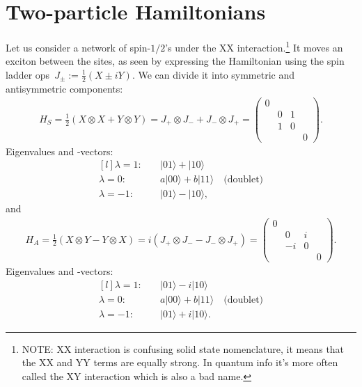 \documentclass[aps,pra,12pt,nofootinbib,superscriptaddress,longbibliography,showpacs]{revtex4-1}
\theoremstyle{plain}
\theoremstyle{definition}
\newcommand{\ket}[1]{\ensuremath{|#1\rangle}}
\newcommand{\be}{\begin{equation}}
\newcommand{\ee}{\end{equation}}
\begin{document}
\section{Two-particle Hamiltonians} \label{sec:twoparticle}

Let us consider a network of spin-$1/2$'s under the XX
interaction.\footnote{NOTE: XX interaction is confusing solid state
nomenclature, it means that the XX
and YY terms are equally strong. In quantum info it's more often
called the XY interaction which is also a bad name.}
It moves an exciton between the sites, as seen by expressing the
Hamiltonian using the spin ladder ops~$J_\pm := \tfrac{1}{2}(X \pm i Y)$.
We can divide it into symmetric and antisymmetric components:
\begin{align}
H_S = \frac{1}{2}\left(X \otimes X +Y \otimes Y\right)
= J_+ \otimes J_- +J_- \otimes J_+
=
\begin{pmatrix}
0\\
& 0 & 1\\
& 1 & 0\\
& & & 0
\end{pmatrix}.
\label{eq:HS}
\end{align}
Eigenvalues and -vectors:
\be
\begin{matrix*}[l]
\lambda = 1: & \quad \ket{01} +\ket{10}\\
\lambda = 0: & \quad a\ket{00} +b\ket{11} \quad \text{(doublet)}\\
\lambda = -1: & \quad \ket{01} -\ket{10},
\end{matrix*}
\ee
and
\begin{align}
H_A = \frac{1}{2}\left(X \otimes Y -Y \otimes X\right)
= i\left(J_+ \otimes J_- -J_- \otimes J_+ \right)
=
\begin{pmatrix}
0\\
& 0 & i\\
& -i & 0\\
& & & 0
\end{pmatrix}.
\label{eq:HA}
\end{align}
Eigenvalues and -vectors:
\be
\begin{matrix*}[l]
\lambda = 1: & \quad \ket{01} -i\ket{10}\\
\lambda = 0: & \quad a\ket{00} +b\ket{11} \quad \text{(doublet)}\\
\lambda = -1: & \quad \ket{01} +i\ket{10}.
\end{matrix*}
\ee
\end{document}
